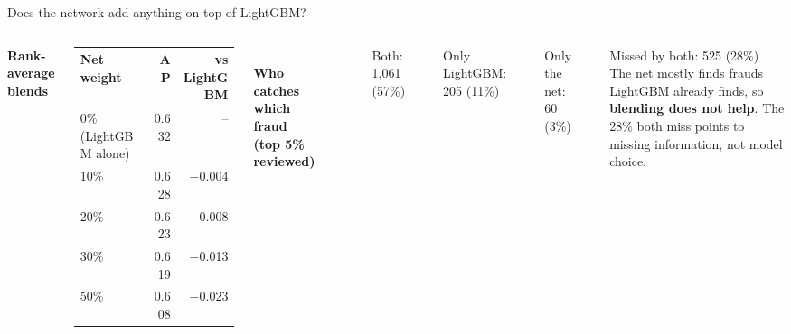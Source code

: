 \documentclass[aspectratio=169,10pt]{beamer}
\begin{document}
\begin{frame}{Does the network add anything on top of LightGBM?}
\begin{columns}[T]
{\color{ink}\bfseries Rank-average blends}\\[4pt]
\renewcommand{\arraystretch}{1.2}\small
\begin{tabularx}{\linewidth}{@{}L rr@{}}
\toprule
\textbf{Net weight} & \textbf{AP} & \textbf{vs LightGBM}\\
\% (LightGBM alone) & 0.632 & -- \\
10\% & 0.628 & $-$0.004 \\
20\% & 0.623 & $-$0.008 \\
30\% & 0.619 & $-$0.013 \\
50\% & 0.608 & $-$0.023 \\
\bottomrule
\end{tabularx}\\[5pt]
{\color{ink}\bfseries Who catches which fraud (top 5\% reviewed)}\\[6pt]
\\[6pt]
\small
\textcolor{ink}{\rule{0.6em}{0.6em}} Both: 1,061 (57\%)\\
\textcolor{amber}{\rule{0.6em}{0.6em}} Only LightGBM: 205 (11\%)\\
\textcolor{emerald}{\rule{0.6em}{0.6em}} Only the net: 60 (3\%)\\
\textcolor{rule}{\rule{0.6em}{0.6em}} Missed by both: 525 (28\%)\\[6pt]
The net mostly finds frauds LightGBM already finds, so \textbf{blending does not help}. The 28\% both miss points to missing information, not model choice.
\end{columns}
\end{frame}
\end{document}
